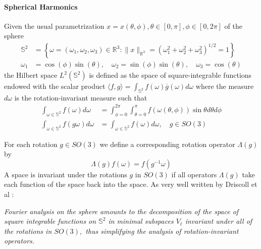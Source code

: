 \paragraph{Spherical Harmonics}
 Given the usual parametrization $x = x(\theta, \phi), \theta\in[0,\pi], \phi\in[0,2\pi]$ of the sphere
\begin{align*}
\mathbb{S}^{2}&=\left\{\omega=\left(\omega_{1}, \omega_{2}, \omega_{3}\right) \in \mathbb{R}^{3} :\|x\|_{\mathbb{R}^{3}}=\left(\omega_{1}^{2}+\omega_{2}^{2}+\omega_{3}^{2}\right)^{1 / 2}=1\right\}\\
\omega_{1}&=\cos (\phi) \sin (\theta), \quad \omega_{2}=\sin (\phi) \sin (\theta), \quad \omega_{3}=\cos (\theta)
\end{align*}
the Hilbert space $L^2(\mathbb S^2)$ is defined as the space of square-integrable functions endowed with the scalar product $\langle f,g\rangle=\int_{\mathbb S^2}f(\omega)\overline g(\omega)d\omega$ where the measure $d\omega$ is the rotation-invariant measure such that
\begin{align}
\int_{\omega \in \mathbb S^{2}} f(\omega) d \omega&=\int_{\phi=0}^{2 \pi} \int_{\theta=0}^{\pi} f(\omega(\theta, \phi)) \sin \theta d \theta d \phi\\
\int_{\omega \in \mathbb S^{2}} f(g \omega) d \omega&=\int_{\omega \in \mathbb S^{2}} f(\omega) d \omega, \quad g \in S O(3)
\end{align}

For each rotation $g\in SO(3)$ we define a corresponding rotation operator $\Lambda(g)$ by
\begin{equation}\label{eq:rotation operator}
	\Lambda(g) f(\omega)=f\left(g^{-1} \omega\right)
\end{equation}
A space is invariant under the rotations $g$ in $SO(3)$ if all operators $\Lambda(g)$ take each function of the space back into the space. As very well written by Driscoll et al \cite{Driscoll:1994:CFT:184069.184073}:

\vspace{0.2cm}
\textit{Fourier analysis on the sphere amounts to the decomposition of the space of square integrable functions on \(\mathbb S^{2}\) in minimal subspaces $V_\ell$ invariant under all of the rotations in \(S O(3),\) thus simplifying the analysis of rotation-invariant operators.}
\vspace{0.2cm}

